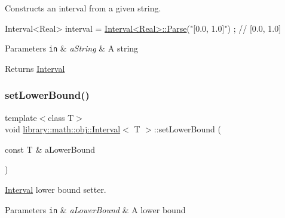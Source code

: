 Constructs an interval from a given string. 


\begin{DoxyCode}
Interval<Real> interval = \hyperlink{classlibrary_1_1math_1_1obj_1_1_interval_a9ed15c38ee04880a1aba75defa086a79}{Interval<Real>::Parse}(\textcolor{stringliteral}{"[0.0, 1.0]"}) ; \textcolor{comment}{// [0.0, 1.0]}
\end{DoxyCode}



\begin{DoxyParams}[1]{Parameters}
\mbox{\tt in}  & {\em a\+String} & A string \\
\hline
\end{DoxyParams}
\begin{DoxyReturn}{Returns}
\hyperlink{classlibrary_1_1math_1_1obj_1_1_interval}{Interval} 
\end{DoxyReturn}
\mbox{\label{classlibrary_1_1math_1_1obj_1_1_interval_a5ceb8fb56f920193c8b18346992b5d02}} 
\subsubsection{\texorpdfstring{set\+Lower\+Bound()}{setLowerBound()}}
{\footnotesize\ttfamily template$<$class T$>$ \\
void \hyperlink{classlibrary_1_1math_1_1obj_1_1_interval}{library\+::math\+::obj\+::\+Interval}$<$ T $>$\+::set\+Lower\+Bound (\begin{DoxyParamCaption}\item[{const T \&}]{a\+Lower\+Bound }\end{DoxyParamCaption})}



\hyperlink{classlibrary_1_1math_1_1obj_1_1_interval}{Interval} lower bound setter. 


\begin{DoxyParams}[1]{Parameters}
\mbox{\tt in}  & {\em a\+Lower\+Bound} & A lower bound \\
\hline
\end{DoxyParams}
\mbox{\label{classlibrary_1_1math_1_1obj_1_1_interval_a4dfb117d5a9c23bd32a3631fcf3686ec}} 
